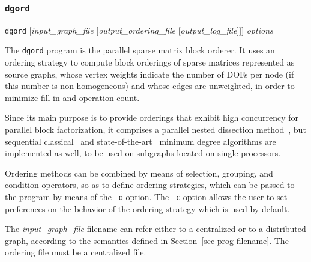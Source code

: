 \subsubsection{{\tt dgord}}

\begin{itemize}
\progsyn
{\tt dgord} [{\it input\_graph\_file} [{\it output\_ordering\_file} [{\it output\_log\_file}]]] {\it options}

\progdes

The {\tt dgord} program is the parallel sparse matrix block
orderer. It uses an ordering strategy to compute block orderings of
sparse matrices represented as source graphs, whose vertex weights
indicate the number of DOFs per node (if this number is non
homogeneous) and whose edges are unweighted, in order to minimize
fill-in and operation count.

Since its main purpose is to provide orderings that exhibit high
concurrency for parallel block factorization, it comprises a parallel
nested dissection method~\cite{geli81}, but sequential
classical~\cite{liu-85} and state-of-the-art~\cite{peroam00a}
minimum degree algorithms are implemented as well, to be used on
subgraphs located on single processors.

Ordering methods can be combined by means of selection, grouping, and
condition operators, so as to define ordering strategies, which can be
passed to the program by means of the {\tt -o} option. The {\tt -c}
option allows the user to set preferences on the behavior of the
ordering strategy which is used by default.

The {\it input\_graph\_file} filename can refer either to a
centralized or to a distributed graph, according to the semantics
defined in Section~\ref{sec-prog-filename}. The ordering file must be
a centralized file.


\end{itemize}
